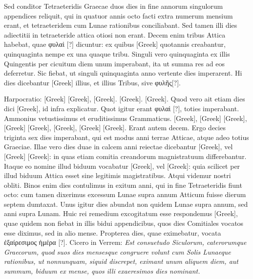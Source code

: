Sed conditor
Tetraeteridis Graecae duos dies in fine annorum singulorum appendices
reliquit, qui in quatuor annis octo facti extra numerum mensium
erant, et tetraeteridem cum Lunae rationibus conciliabant.
Sed tamen
illi dies adiectitii in tetraeteride attica otiosi non erant.
Decem enim
tribus Attica habebat, quae \textgreek{φυλαὶ [?]} dicuntur: ex quibus
 \textgreek{[Greek]}
quotannis creabantur, quinquaginta nempe ex una quaque tribu.
Singuli
vero quinquaginta ex illis Quingentis per cicuitum diem unum
imperabant, ita ut summa res ad eos deferretur.
Sic fiebat, ut singuli
quinquaginta anno vertente  dies imperarent.
Hi dies dicebantur
\textgreek{[Greek]} illius, et illius Tribus, sive \textgreek{φυλῆς[?]}.

Harpocratio: \textgreek{[Greek]}
\textgreek{[Greek]}, \textgreek{[Greek]}.
\textgreek{[Greek]}.
\textgreek{[Greek]}.
Quod vero
ait etiam  dies dici \textgreek{[Greek]}, id infra explicatur.
Quot igitur
erant \textgreek{φυλαὶ [?]}, toties  imperabant.
Ammonius vetustissimus et eruditissimus
Grammaticus.
\textgreek{[Greek]}, \textgreek{[Greek]}
\textgreek{[Greek]}, \textgreek{[Greek]}
\textgreek{[Greek]}, \textgreek{[Greek]}, \textgreek{[Greek]}
\textgreek{[Greek]}.
Erant autem decem.
Ergo decies triginta sex dies imperabant,
qui est modus anni terrae Atticae, atque adeo totius Graeciae.
Illae
vero dies duae in calcem anni reiectae dicebantur \textgreek{[Greek]},
 vel \textgreek{[Greek]}
\textgreek{[Greek]}: in quas etiam comitia creandorum magnistratuum
 differebantur.
Itaque eo nomine illud biduum vocabatur \textgreek{[Greek]}, vel
\textgreek{[Greek]}: quia scilicet per illud biduum
 Attica esset sine legitimis
magistratibus.
Atqui videmur nostri obliti.
Binos enim dies contulimus
in exitum anni, qui in fine Tetraeteridis fiunt octo: cum tamen
dixerimus excessum Lunae supra annum Atticum fuisse dierum septem
dumtaxat.
Unus igitur dies abundat non quidem Lunae supra annum,
sed anni supra Lunam.
Huic rei remedium excogitatum esse respondemus
\textgreek{[Greek]}, quae quidem non fiebat in illis bidui appendicibus,
quos dies Comitiales vocatos esse diximus, sed in alio mense.
Propterea
dies, quae eximebatur, vocata \textgreek{ἐξαίρεσιμος ἡμέρα [?]}.
Cicero in Verrem: \emph{Est
consuetudo Siculorum, caterorumque Graecorum, quod suos dies mensesque
congruere volunt cum Solis Lunaeque rationibus, ut nonnunquam, siquid
discrepet, eximant unum aliquem diem, aut summum, biduum ex
mense, quos illi exaeresimos dies nominant.}
